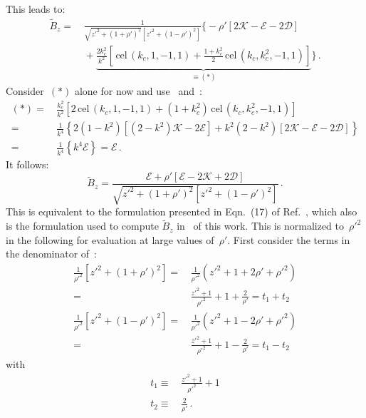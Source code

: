 This leads to:
\begin{align}
 \tilde{B}_z
 =&\, \frac{1}{\sqrt{z'^2 + (1 + \rho')^2} \left[z'^2 + (1 - \rho')^2\right]} \Biggl\{
      -\rho' \left[ 2 \mathcal{K} - \mathcal{E} - 2 \mathcal{D} \right] \nonumber \\
 ~&\, + \underbrace{\frac{2 k_c^2}{k^2} \left[ \,\textrm{cel}\,(k_c, 1, -1, 1) + \frac{1 + k_c^2}{2} \,\textrm{cel}\,(k_c, k_c^2, -1, 1) \right]}_{\equiv(*)} \Biggr\} \, .
\end{align}
Consider~$(*)$ alone for now and use~ and~:
\begin{align}
  (*)
 =&\, \frac{k_c^2}{k^2} \left[ 2 \,\textrm{cel}\,(k_c, 1, -1, 1) + (1 + k_c^2) \,\textrm{cel}\,(k_c, k_c^2, -1, 1) \right] \nonumber \\
 =&\, \frac{1}{k^4} \left\{ 2(1 - k^2) \left[(2-k^2)\mathcal{K} - 2 \mathcal{E} \right] + k^2 (2 - k^2) \left[2\mathcal{K} - \mathcal{E} - 2 \mathcal{D} \right] \right\} \nonumber \\
 =&\, \frac{1}{k^4} \left\{ k^4 \mathcal{E} \right\} = \mathcal{E} \, . \label{eqn:cwl_B_z_star}
\end{align}
It follows:
\begin{equation}
 \tilde{B}_z
 = \frac{\mathcal{E} + \rho' \left[\mathcal{E} - 2 \mathcal{K} + 2 \mathcal{D} \right]}
        {\sqrt{z'^2 + (1 + \rho')^2} \left[z'^2 + (1 - \rho')^2\right]} \, . \label{eqn:cwl_B_z_f1_appendix}
\end{equation}
This is equivalent to the formulation presented in Eqn.~(17) of Ref.~\cite{walstrom_2017},
which also is the formulation used to compute $\tilde{B}_z$ in~ of this work.
This is normalized to~$\rho'^2$ in the following for evaluation at large values of~$\rho'$.
First consider the terms in the denominator of~:
\begin{align}
  \frac{1}{\rho'^2} \left[ z'^2 + (1 + \rho')^2 \right]
 =&\, \frac{1}{\rho'^2} \left( z'^2 + 1 + 2 \rho' + \rho'^2 \right) \nonumber \\
 =&\, \frac{z'^2 + 1}{\rho'^2} + 1 + \frac{2}{\rho'} = t_1 + t_2 \nonumber \\
 \frac{1}{\rho'^2} \left[ z'^2 + (1 - \rho')^2 \right]
 =&\, \frac{1}{\rho'^2} \left( z'^2 + 1 - 2 \rho' + \rho'^2 \right) \nonumber \\
 =&\, \frac{z'^2 + 1}{\rho'^2} + 1 - \frac{2}{\rho'} = t_1 - t_2
\end{align}
with
\begin{align}
  t_1 \equiv&\, \frac{z'^2 + 1}{\rho'^2} + 1 \\
  t_2 \equiv&\, \frac{2}{\rho'} \, .
\end{align}
